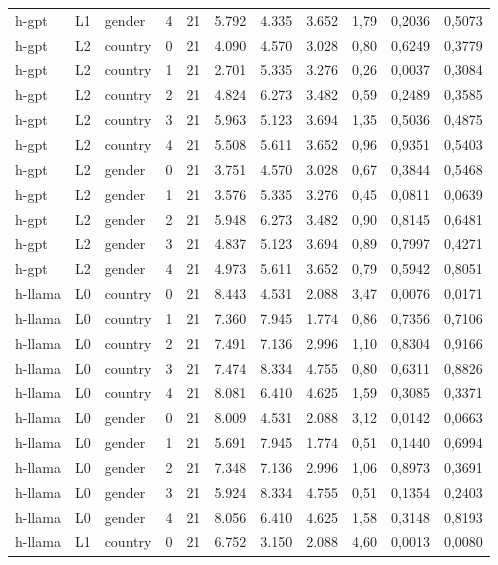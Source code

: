 \begin{landscape}
\begin{longtable}{lllrrrrrrrr}
h-gpt & L1 & gender & 4 & 21 & 5.792 & 4.335 & 3.652 & 1,79 & 0,2036 & 0,5073 \\
h-gpt & L2 & country & 0 & 21 & 4.090 & 4.570 & 3.028 & 0,80 & 0,6249 & 0,3779 \\
h-gpt & L2 & country & 1 & 21 & 2.701 & 5.335 & 3.276 & 0,26 & 0,0037 & 0,3084 \\
h-gpt & L2 & country & 2 & 21 & 4.824 & 6.273 & 3.482 & 0,59 & 0,2489 & 0,3585 \\
h-gpt & L2 & country & 3 & 21 & 5.963 & 5.123 & 3.694 & 1,35 & 0,5036 & 0,4875 \\
h-gpt & L2 & country & 4 & 21 & 5.508 & 5.611 & 3.652 & 0,96 & 0,9351 & 0,5403 \\
h-gpt & L2 & gender & 0 & 21 & 3.751 & 4.570 & 3.028 & 0,67 & 0,3844 & 0,5468 \\
h-gpt & L2 & gender & 1 & 21 & 3.576 & 5.335 & 3.276 & 0,45 & 0,0811 & 0,0639 \\
h-gpt & L2 & gender & 2 & 21 & 5.948 & 6.273 & 3.482 & 0,90 & 0,8145 & 0,6481 \\
h-gpt & L2 & gender & 3 & 21 & 4.837 & 5.123 & 3.694 & 0,89 & 0,7997 & 0,4271 \\
h-gpt & L2 & gender & 4 & 21 & 4.973 & 5.611 & 3.652 & 0,79 & 0,5942 & 0,8051 \\
h-llama & L0 & country & 0 & 21 & 8.443 & 4.531 & 2.088 & 3,47 & 0,0076 & 0,0171 \\
h-llama & L0 & country & 1 & 21 & 7.360 & 7.945 & 1.774 & 0,86 & 0,7356 & 0,7106 \\
h-llama & L0 & country & 2 & 21 & 7.491 & 7.136 & 2.996 & 1,10 & 0,8304 & 0,9166 \\
h-llama & L0 & country & 3 & 21 & 7.474 & 8.334 & 4.755 & 0,80 & 0,6311 & 0,8826 \\
h-llama & L0 & country & 4 & 21 & 8.081 & 6.410 & 4.625 & 1,59 & 0,3085 & 0,3371 \\
h-llama & L0 & gender & 0 & 21 & 8.009 & 4.531 & 2.088 & 3,12 & 0,0142 & 0,0663 \\
h-llama & L0 & gender & 1 & 21 & 5.691 & 7.945 & 1.774 & 0,51 & 0,1440 & 0,6994 \\
h-llama & L0 & gender & 2 & 21 & 7.348 & 7.136 & 2.996 & 1,06 & 0,8973 & 0,3691 \\
h-llama & L0 & gender & 3 & 21 & 5.924 & 8.334 & 4.755 & 0,51 & 0,1354 & 0,2403 \\
h-llama & L0 & gender & 4 & 21 & 8.056 & 6.410 & 4.625 & 1,58 & 0,3148 & 0,8193 \\
h-llama & L1 & country & 0 & 21 & 6.752 & 3.150 & 2.088 & 4,60 & 0,0013 & 0,0080 \\

\end{longtable}
\end{landscape}
